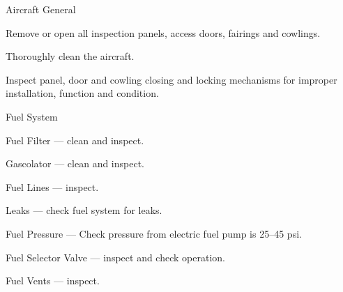 \begin{enumerate*}
  \item{Aircraft General}
  \begin{enumerate*}
    \item Remove or open all inspection panels, access doors, fairings and cowlings.
    \item Thoroughly clean the aircraft.
    \item Inspect panel, door and cowling closing and locking mechanisms for improper installation, function and condition.
		\end{enumerate*}

	\item{Fuel System} 
	\begin{enumerate*}
		\item Fuel Filter --- clean and inspect. 
		\item Gascolator --- clean and inspect. 
		\item Fuel Lines --- inspect.
		\item Leaks --- check fuel system for leaks.
		\item Fuel Pressure --- Check pressure from electric fuel pump is 25--45 psi. 
		\item Fuel Selector Valve --- inspect and check operation.
		\item Fuel Vents --- inspect.
	\end{enumerate*}



\end{enumerate*}
